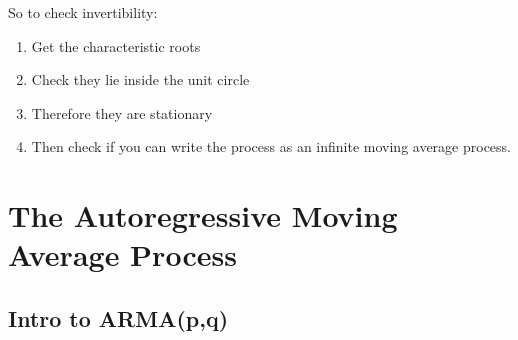 So to check invertibility:
\begin{enumerate}
    \item Get the characteristic roots
    \item Check they lie inside the unit circle 
    \item  Therefore they are stationary
    \item Then check if you can write the process as an infinite moving average
        process.
\end{enumerate}

\section{The Autoregressive Moving Average Process}

\subsection{Intro to ARMA(p,q)}

